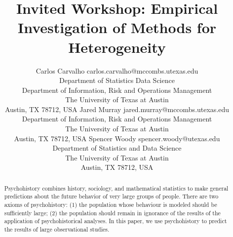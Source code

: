 \documentclass[twoside,11pt]{article}
\begin{document}


\title{Invited Workshop: Empirical Investigation of Methods for
  Heterogeneity}

\author{\name Carlos Carvalho \email
  carlos.carvalho@mccombs.utexas.edu \\
  \addr Department of Statistics Data Science \\ Department of
  Information, Risk and Operations Management  \\
  The University of Texas at Austin\\
  Austin, TX 78712, USA
  \AND
  \name Jared Murray \email
  jared.murray@mccombs.utexas.edu \\
  \addr Department of
  Information, Risk and Operations Management  \\
  The University of Texas at Austin\\
  Austin, TX 78712, USA
  \AND
  \name Spencer Woody  \email
  spencer.woody@utexas.edu \\
  \addr Department of Statistics and Data Science  \\
  The University of Texas at Austin\\
  Austin, TX 78712, USA}



\maketitle


\begin{abstract}%
  Psychohistory combines history, sociology, and mathematical
  statistics to make general predictions about the future behavior of
  very large groups of people. There are two axioms of psychohistory:
  (1) the population whose behaviour is modeled should be sufficiently
  large; (2) the population should remain in ignorance of the results
  of the application of psychohistorical analyses.  In this paper, we
  use psychohistory to predict the results of large observational
  studies.
\end{abstract}
\end{document}
